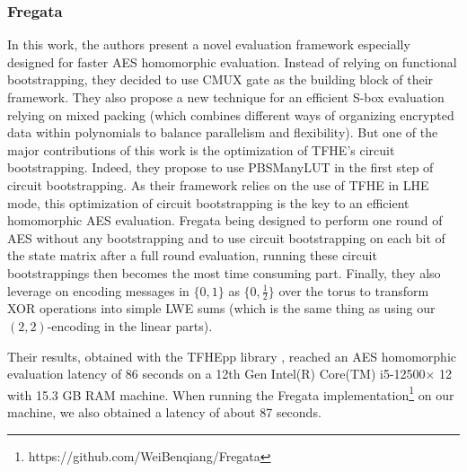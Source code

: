 \subsubsection{Fregata \cite{ISC:WWLLL23}}
In this work, the authors present a novel evaluation framework especially designed for faster \gls{AES} homomorphic evaluation. Instead of relying on functional bootstrapping, they decided to use CMUX gate as the building block of their framework. They also propose a new technique for an efficient \gls{S-box} evaluation relying on mixed packing (which combines different ways of organizing encrypted data within polynomials to balance parallelism and flexibility). %
But one of the major contributions of this work is the optimization of \gls{TFHE}'s circuit bootstrapping. Indeed, they propose to use PBSManyLUT \cite{AC:CLOT21} in the first step of circuit bootstrapping. As their framework relies on the use of \gls{TFHE} in LHE mode, this optimization of circuit bootstrapping is the key to an efficient homomorphic \gls{AES} evaluation. Fregata being designed to perform one round of \gls{AES} without any bootstrapping and to use circuit bootstrapping on each bit of the state matrix after a full round evaluation, running these circuit bootstrappings then becomes the most time consuming part.
Finally, they also leverage on encoding messages in $\{0, 1\}$ as $\{0, \frac{1}{2}\}$ over the torus to transform XOR operations into simple LWE sums (which is the same thing as using our $(2, 2)$-encoding in the linear parts).

Their results, obtained with the TFHEpp library \cite{TFHEpp}, reached an \gls{AES} homomorphic evaluation latency of 86 seconds on a 12th Gen Intel(R) Core(TM) i5-12500× 12 with 15.3 GB RAM machine. When running the Fregata implementation\footnote{https://github.com/WeiBenqiang/Fregata} on our machine, we also obtained a latency of about 87 seconds.


